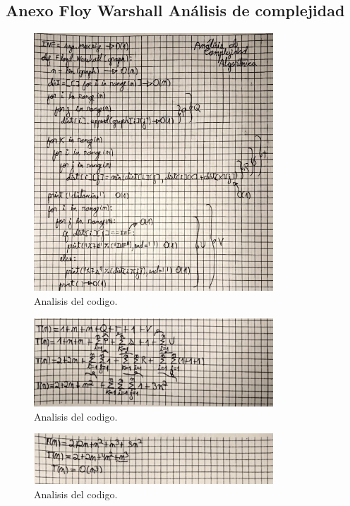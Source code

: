 \subsection{Anexo Floy Warshall Análisis de complejidad}
\begin{figure}[H]
	\centering
	\includegraphics[width=0.8\textwidth]{complejidad_distancia_ejem1_1.png}
	\caption{Analisis del codigo.}
	\label{fig:complejidad1}
\end{figure}
\begin{figure}[H]
	\centering
	\includegraphics[width=0.8\textwidth]{complejidad_distancia_ejem1_2.png}
	\caption{Analisis del codigo.}
	\label{fig:complejidad1}
\end{figure}
\begin{figure}[H]
	\centering
	\includegraphics[width=0.8\textwidth]{complejidad_distancia_ejem1_3.png}
	\caption{Analisis del codigo.}
	\label{fig:complejidad1}
\end{figure}

